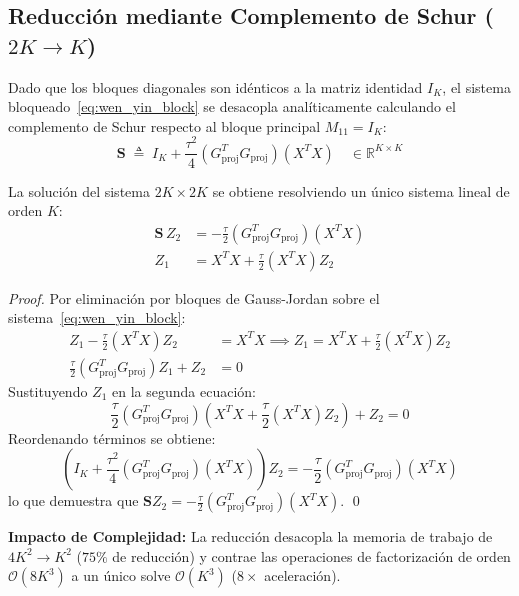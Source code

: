 \subsection{Reducción mediante Complemento de Schur ($2K \to K$)}
Dado que los bloques diagonales son idénticos a la matriz identidad $I_K$, el sistema bloqueado~\eqref{eq:wen_yin_block} se desacopla analíticamente calculando el complemento de Schur respecto al bloque principal $M_{11} = I_K$:
\begin{equation}
\mathbf{S} \;\triangleq\; I_K + \frac{\tau^2}{4} (G_{\text{proj}}^T G_{\text{proj}})(X^T X) \quad \in \mathbb{R}^{K \times K}
\end{equation}

\begin{theorem}
\label{thm:schur_stiefel}
La solución del sistema $2K \times 2K$ se obtiene resolviendo un único sistema lineal de orden $K$:
\begin{align}
\mathbf{S} \, Z_2 &= -\frac{\tau}{2} (G_{\text{proj}}^T G_{\text{proj}})(X^T X) \\
Z_1 &= X^T X + \frac{\tau}{2} (X^T X) Z_2
\end{align}
\end{theorem}

\begin{proof}
Por eliminación por bloques de Gauss-Jordan sobre el sistema~\eqref{eq:wen_yin_block}:
\begin{align}
Z_1 - \frac{\tau}{2} (X^T X) Z_2 &= X^T X \implies Z_1 = X^T X + \frac{\tau}{2} (X^T X) Z_2 \\
\frac{\tau}{2} (G_{\text{proj}}^T G_{\text{proj}}) Z_1 + Z_2 &= 0
\end{align}
Sustituyendo $Z_1$ en la segunda ecuación:
\begin{equation}
\frac{\tau}{2} (G_{\text{proj}}^T G_{\text{proj}}) \left( X^T X + \frac{\tau}{2} (X^T X) Z_2 \right) + Z_2 = 0
\end{equation}
Reordenando términos se obtiene:
\begin{equation}
\left( I_K + \frac{\tau^2}{4} (G_{\text{proj}}^T G_{\text{proj}})(X^T X) \right) Z_2 = -\frac{\tau}{2} (G_{\text{proj}}^T G_{\text{proj}})(X^T X)
\end{equation}
lo que demuestra que $\mathbf{S} Z_2 = -\frac{\tau}{2} (G_{\text{proj}}^T G_{\text{proj}})(X^T X)$. \qed
\end{proof}

\textbf{Impacto de Complejidad:} La reducción desacopla la memoria de trabajo de $4K^2 \to K^2$ ($75\%$ de reducción) y contrae las operaciones de factorización de orden $\mathcal{O}(8K^3)$ a un único solve $\mathcal{O}(K^3)$ ($8\times$ aceleración).

